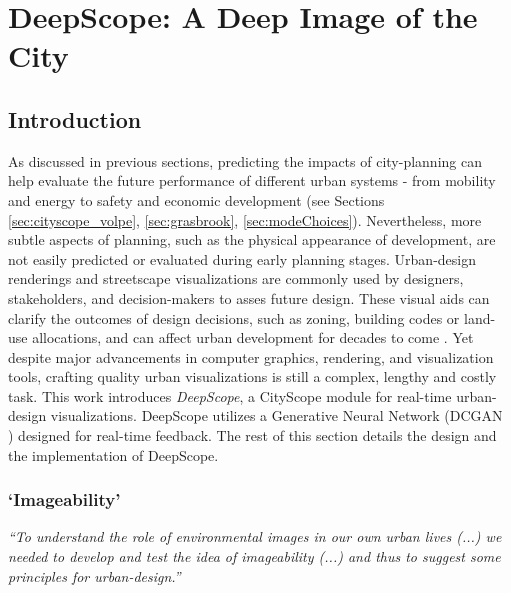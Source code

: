 \section{DeepScope: A Deep Image of the City}\label{sec:deepscope}

{
    \subsection{Introduction}
    {
        As discussed in previous sections, predicting the impacts of city-planning can help evaluate the future performance of different urban systems - from mobility and energy to safety and economic development (see Sections \eqref{sec:cityscope_volpe}, \eqref{sec:grasbrook}, \eqref{sec:modeChoices}). Nevertheless, more subtle aspects of planning, such as the physical appearance of development, are not easily predicted or evaluated during early planning stages.
        \newline
        Urban-design renderings and streetscape visualizations are commonly used by designers, stakeholders, and decision-makers to asses future design. These visual aids can clarify the outcomes of design decisions, such as zoning, building codes or land-use allocations, and can affect urban development for decades to come \cite{al1999using, smith1998visual}. Yet despite major advancements in computer graphics, rendering, and visualization tools, crafting quality urban visualizations is still a complex, lengthy and costly task. This work introduces \textit{DeepScope}, a CityScope module for real-time urban-design visualizations. DeepScope utilizes a Generative Neural Network (DCGAN \cite{mirza2014conditional}) designed for real-time feedback. The rest of this section details the design and the implementation of DeepScope.

        \subsubsection{`Imageability'}
        {
            \emph{``To understand the role of environmental images in our own urban lives (...) we needed to develop and test the idea of imageability (...) and thus to suggest some principles for urban-design.''} \cite{lynch1960image}


}}}
